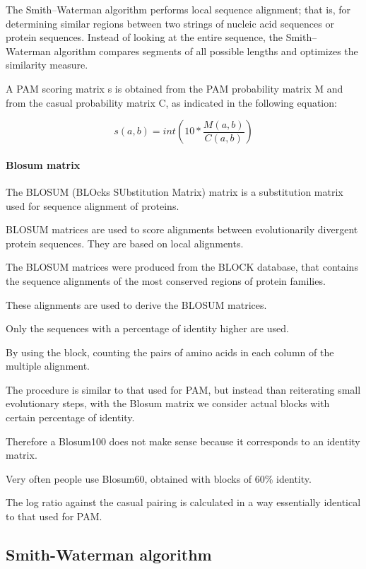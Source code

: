 The Smith–Waterman algorithm performs local sequence alignment; that is, for
determining similar regions between two strings of nucleic acid sequences or
protein sequences. Instead of looking at the entire sequence, the
Smith–Waterman algorithm compares segments of all possible lengths and
optimizes the similarity measure.

A PAM scoring matrix s is obtained from the PAM
probability matrix M and from the casual probability
matrix C, as indicated in the following equation:

\begin{equation}
s(a,b) = int(10*\frac{M(a,b)}{C(a,b)})
\end{equation}

\paragraph*{Blosum matrix}

The BLOSUM (BLOcks SUbstitution Matrix) matrix is a
substitution matrix used for sequence alignment of proteins.

BLOSUM matrices are used to score alignments between evolutionarily
divergent protein sequences. They are based on local alignments.

The BLOSUM matrices were produced from the BLOCK database, that contains
the sequence alignments of the most conserved regions of protein families.

These alignments are used to derive the BLOSUM matrices.

Only the sequences with a percentage of identity higher are used.

By using the block, counting the pairs of amino acids in each column of the
multiple alignment.

The procedure is similar to that used for PAM, but instead than reiterating
small evolutionary steps, with the Blosum matrix we consider actual blocks
with certain percentage of identity.

Therefore a Blosum100 does not make sense because it corresponds to an
identity matrix.

Very often people use Blosum60, obtained with blocks of 60\% identity.

The log ratio against the casual pairing is calculated in a way essentially
identical to that used for PAM.

\subsection{Smith-Waterman algorithm}

